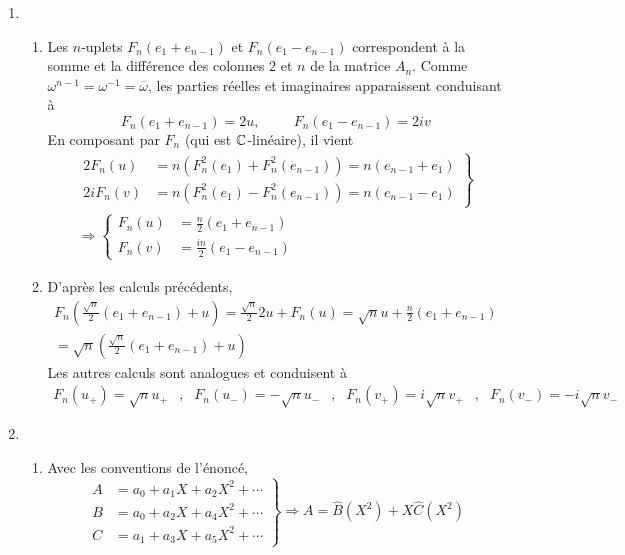 \begin{enumerate}
 \item
\begin{enumerate}
 \item Les $n$-uplets $F_n(e_1+e_{n-1})$ et $F_n(e_1-e_{n-1})$ correspondent à la somme et la différence des colonnes $2$ et $n$ de la matrice $A_n$. Comme $\omega^{n-1}=\omega^{-1}=\overline{\omega}$, les parties réelles et imaginaires apparaissent conduisant à
\begin{displaymath}
 F_n(e_1+e_{n-1})=2u,\hspace{1cm}F_n(e_1-e_{n-1})=2iv
\end{displaymath}
En composant par $F_n$ (qui est $\mathbb{C}$-linéaire), il vient
\begin{multline*}
\left. 
\begin{aligned}
 2F_n(u) &= n\left(F_n^2(e_1)+F_n^2(e_{n-1}) \right)= n(e_{n-1}+e_1)\\
 2iF_n(v)&= n\left(F_n^2(e_1)-F_n^2(e_{n-1}) \right)= n(e_{n-1}-e_1)
\end{aligned}
 \right\rbrace \\ \Rightarrow
\left\lbrace 
\begin{aligned}
 F_n(u) &= \frac{n}{2}(e_1 + e_{n-1}) \\ F_n(v) &= \frac{in}{2}(e_1 - e_{n-1}) 
\end{aligned}
\right. 
\end{multline*}

 \item D'après les calculs précédents, 
\begin{multline*}
 F_n\left( \frac{\sqrt{n}}{2}(e_1+e_{n-1})+u\right) =\frac{\sqrt{n}}{2}2u+F_n(u)
=\sqrt{n}u+\frac{n}{2}(e_1+e_{n-1})\\=\sqrt{n}\left(\frac{\sqrt{n}}{2}(e_1+e_{n-1})+u \right) 
\end{multline*}
Les autres calculs sont analogues et conduisent à
\begin{align*}
 F_n(u_+)= \sqrt{n}u_+&,& F_n(u_-)= -\sqrt{n}u_-&,&
F_n(v_+)= i\sqrt{n}v_+&,& F_n(v_-)= -i\sqrt{n}v_-
\end{align*}

\end{enumerate}

 \item
\begin{enumerate}
 \item Avec les conventions de l'énoncé,
\begin{displaymath}
 \left. 
\begin{aligned}
 A&= a_0+a_1X+a_2 X^2+\cdots \\
 B&= a_0 + a_2X + a_4X^2+\cdots \\
 C&= a_1+ a_3X+a_5X^2 + \cdots
\end{aligned}
\right\rbrace \Rightarrow
A = \widehat{B}(X^2) + X\widehat{C}(X^2)
\end{displaymath}


\end{enumerate}
\end{enumerate}
